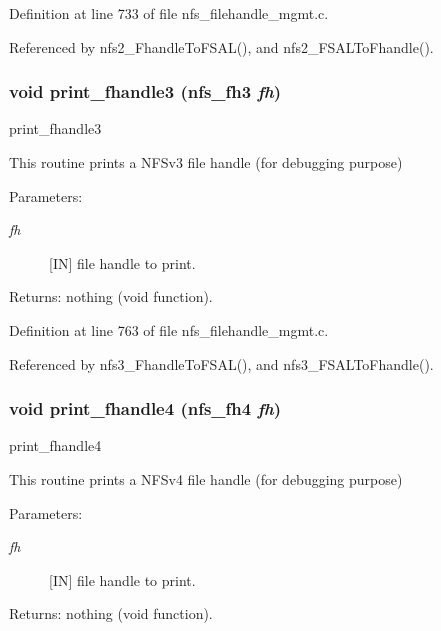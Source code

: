 Definition at line 733 of file nfs\_\-filehandle\_\-mgmt.c.

Referenced by nfs2\_\-Fhandle\-To\-FSAL(), and nfs2\_\-FSALTo\-Fhandle().
\subsubsection{\setlength{\rightskip}{0pt plus 5cm}void print\_\-fhandle3 (nfs\_\-fh3 {\em fh})}\label{nfs__filehandle__mgmt_8c_a20}


print\_\-fhandle3

This routine prints a NFSv3 file handle (for debugging purpose)

\begin{Desc}
\item[Parameters:]
\begin{description}
\item[{\em fh}][IN] file handle to print.\end{description}
\end{Desc}
\begin{Desc}
\item[Returns:]nothing (void function). \end{Desc}


Definition at line 763 of file nfs\_\-filehandle\_\-mgmt.c.

Referenced by nfs3\_\-Fhandle\-To\-FSAL(), and nfs3\_\-FSALTo\-Fhandle().
\subsubsection{\setlength{\rightskip}{0pt plus 5cm}void print\_\-fhandle4 (nfs\_\-fh4 {\em fh})}\label{nfs__filehandle__mgmt_8c_a22}


print\_\-fhandle4

This routine prints a NFSv4 file handle (for debugging purpose)

\begin{Desc}
\item[Parameters:]
\begin{description}
\item[{\em fh}][IN] file handle to print.\end{description}
\end{Desc}
\begin{Desc}
\item[Returns:]nothing (void function). \end{Desc}


